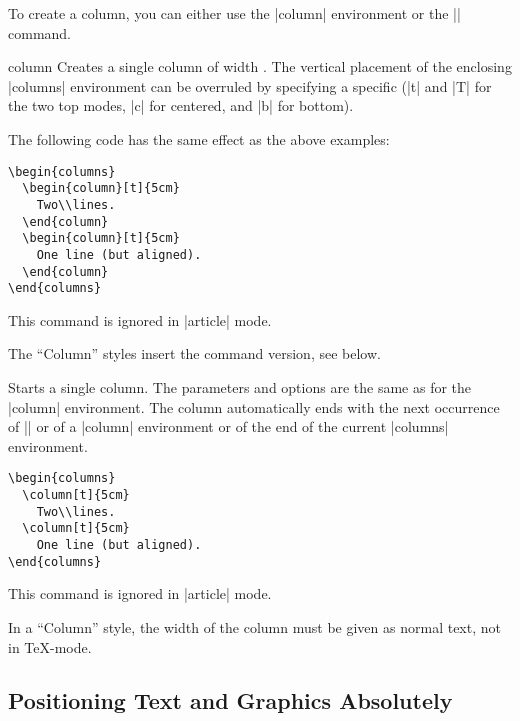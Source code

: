 To create a column, you can either use the |column| environment or the
|\column| command. 

\begin{environment}{{column}}
  Creates a single column of width . The vertical
  placement of the enclosing |columns| environment can be overruled by
  specifying a specific  (|t| and |T| for the two top
  modes, |c| for centered, and |b| for bottom). 

  \example The following code has the same effect as the above examples:
\begin{verbatim}
\begin{columns}
  \begin{column}[t]{5cm}
    Two\\lines.
  \end{column}
  \begin{column}[t]{5cm}
    One line (but aligned).
  \end{column}
\end{columns}
\end{verbatim}
  \articlenote
  This command is ignored in |article| mode.

  \lyxnote
  The ``Column'' styles insert the command version, see below.
\end{environment}

\begin{command}{{\column}}
  Starts a single column. The parameters and options are the same as
  for the |column| environment. The column automatically ends with the
  next occurrence of |\column| or of a |column| environment or of the
  end of the current |columns| environment.

  \example 
\begin{verbatim}
\begin{columns}
  \column[t]{5cm}
    Two\\lines.
  \column[t]{5cm}
    One line (but aligned).
\end{columns}
\end{verbatim}
  \articlenote
  This command is ignored in |article| mode.

  \lyxnote
  In a ``Column'' style, the width of the column must be given as
  normal text, not in \TeX-mode.
\end{command}



\subsection{Positioning Text and Graphics Absolutely}

